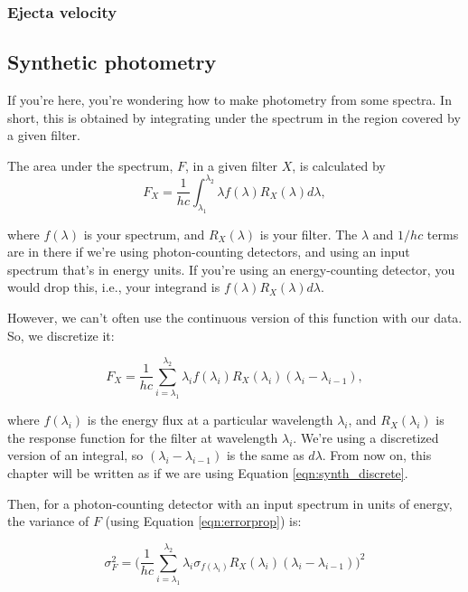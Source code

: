 \subsubsection{Ejecta velocity}
\label{sec:ejectavelocity}

\subsection{Synthetic photometry}

If you're here, you're wondering how to make photometry from some spectra. In short, this is obtained by integrating under the spectrum in the region covered by a given filter. 

The area under the spectrum, $F$, in a given filter $X$, is calculated by
\begin{equation}
    F_{X} = \frac{1}{hc}\int_{\lambda_{1}}^{\lambda_{2}} \lambda f(\lambda) R_{X}(\lambda) d\lambda,
\label{eqn:synthint}
\end{equation}

where $f(\lambda)$ is your spectrum, and $R_{X}(\lambda)$ is your filter. The $\lambda$ and $1/hc$ terms are in there if we're using photon-counting detectors, and using an input spectrum that's in energy units. If you're using an energy-counting detector, you would drop this, i.e., your integrand is $f(\lambda) R_{X}(\lambda) d\lambda$.

However, we can't often use the continuous version of this function with our data. So, we discretize it:

\begin{equation}
    F_{X} = \frac{1}{hc}\sum_{i=\lambda_{1}}^{\lambda_{2}} \lambda_{i} f(\lambda_{i}) R_{X}(\lambda_{i})(\lambda_{i} - \lambda_{i-1}),
\label{eqn:synth_discrete}
\end{equation}

where $f(\lambda_{i})$ is the energy flux at a particular wavelength $\lambda_{i}$, and $R_{X}(\lambda_{i})$ is the response function for the filter at wavelength $\lambda_{i}$. We're using a discretized version of an integral, so $(\lambda_{i} - \lambda_{i-1})$ is the same as $d\lambda$. From now on, this chapter will be written as if we are using Equation \ref{eqn:synth_discrete}.

Then, for a photon-counting detector with an input spectrum in units of energy, the variance of $F$ (using Equation \ref{eqn:errorprop}) is:

\begin{equation}
\label{eqn:varphot}
    \sigma_{F}^{2} = \Big( \frac{1}{hc}\sum_{i=\lambda_{1}}^{\lambda_{2}} \lambda_{i}\sigma_{f(\lambda_{i})} R_{X}(\lambda_{i})(\lambda_{i} - \lambda_{i-1}) \Big)^{2}
\end{equation}

